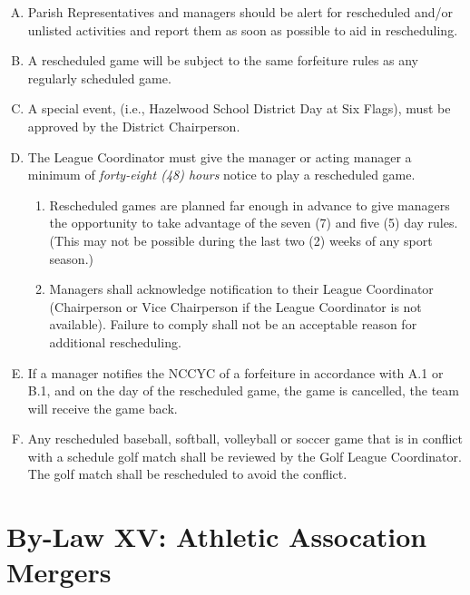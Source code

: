 \begin{enumerate}[A.]
    \item Parish Representatives and managers should be alert for rescheduled and/or unlisted activities and report them as soon as possible to aid in rescheduling.
    \item A rescheduled game will be subject to the same forfeiture rules as any regularly scheduled game.
    \item A special event, (i.e., Hazelwood School District Day at Six Flags), must be approved by the District Chairperson.
    \item The League Coordinator must give the manager or acting manager a minimum of {\em forty-eight (48) hours} notice to play a rescheduled game.
    \begin{enumerate}[1.]
        \item Rescheduled games are planned far enough in advance to give managers the opportunity to take advantage of the seven (7) and five (5) day rules.  (This may not be possible during the last two (2) weeks of any sport season.)
        \item Managers shall acknowledge notification to their League Coordinator (Chairperson or Vice Chairperson if the League Coordinator is not available).  Failure to comply shall not be an acceptable reason for additional rescheduling.
    \end{enumerate}
    \item If a manager notifies the NCCYC of a forfeiture in accordance with A.1 or B.1, and on the day of the rescheduled game, the game is cancelled, the team will receive the game back.
    \item Any rescheduled baseball, softball, volleyball or soccer game that is in conflict with a schedule golf match shall be reviewed by the Golf League Coordinator.  The golf match shall be rescheduled to avoid the conflict.
\end{enumerate}

\section{By-Law XV: Athletic Assocation Mergers}
\label{sec:bylaw-15}
